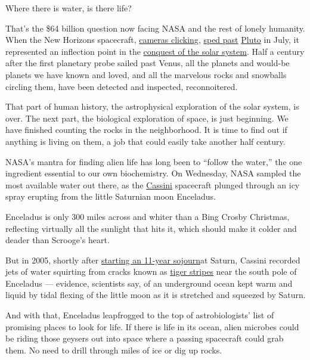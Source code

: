 Where there is water, is there life?

That's the \$64 billion question now facing NASA and the rest of lonely
humanity. When the New Horizons spacecraft,
\href{http://www.nytimes3xbfgragh.onion/interactive/2015/07/15/science/space/new-horizons-pluto-flyby-photos.html}{cameras
clicking},
\href{http://www.nytimes3xbfgragh.onion/interactive/2015/07/14/science/space/pluto-flyby.html}{sped
past}
\href{http://www.nytimes3xbfgragh.onion/2015/07/15/science/space/nasa-new-horizons-spacecraft-reaches-pluto.html}{Pluto}
in July, it represented an inflection point in the
\href{http://www.nytimes3xbfgragh.onion/video/science/100000003783764/fast-and-light-to-pluto.html}{conquest
of the solar system}. Half a century after the first planetary probe
sailed past Venus, all the planets and would-be planets we have known
and loved, and all the marvelous rocks and snowballs circling them, have
been detected and inspected, reconnoitered.

That part of human history, the astrophysical exploration of the solar
system, is over. The next part, the biological exploration of space, is
just beginning. We have finished counting the rocks in the neighborhood.
It is time to find out if anything is living on them, a job that could
easily take another half century.

NASA's mantra for finding alien life has long been to ``follow the
water,'' the one ingredient essential to our own biochemistry. On
Wednesday, NASA sampled the most available water out there, as the
\href{https://www.nytimes3xbfgragh.onion/2017/09/14/science/cassini-grand-finale-saturn.html}{Cassini}
spacecraft plunged through an icy spray erupting from the little
Saturnian moon Enceladus.

Enceladus is only 300 miles across and whiter than a Bing Crosby
Christmas, reflecting virtually all the sunlight that hits it, which
should make it colder and deader than Scrooge's heart.

But in 2005, shortly after
\href{http://www.nytimes3xbfgragh.onion/2004/07/01/science/01CND-SATU.html}{starting
an 11-year sojourn}at Saturn, Cassini recorded jets of water squirting
from cracks known as
\href{http://www.nasa.gov/mission_pages/cassini/media/cassini-083005.html}{tiger
stripes} near the south pole of Enceladus --- evidence, scientists say,
of an underground ocean kept warm and liquid by tidal flexing of the
little moon as it is stretched and squeezed by Saturn.

And with that, Enceladus leapfrogged to the top of astrobiologists' list
of promising places to look for life. If there is life in its ocean,
alien microbes could be riding those geysers out into space where a
passing spacecraft could grab them. No need to drill through miles of
ice or dig up rocks.

